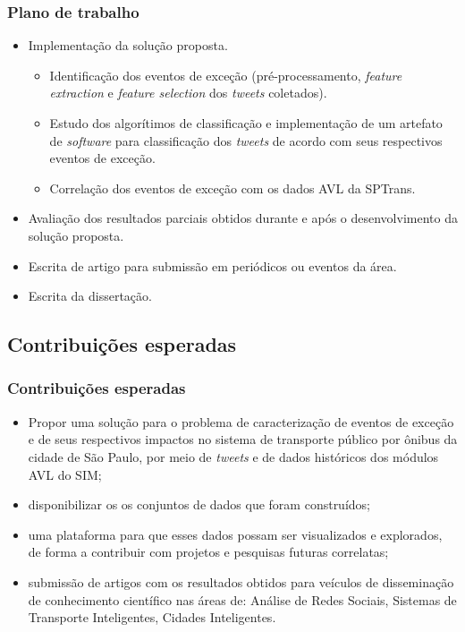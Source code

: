 \documentclass{beamer}
\begin{document}
\begin{frame}
\frametitle{Plano de trabalho}
\begin{itemize}
\item Implementação da solução proposta.
\begin{itemize}
\item Identificação dos eventos de exceção (pré-processamento, \textit{feature extraction} e \textit{feature selection} dos \textit{tweets} coletados).
\item Estudo dos algorítimos de classificação e implementação de um artefato de \textit{software} para classificação dos \textit{tweets} de acordo com seus respectivos eventos de exceção.
\item Correlação dos eventos de exceção com os dados AVL da SPTrans.
\end{itemize}
\item Avaliação dos resultados parciais obtidos durante e após o desenvolvimento da solução proposta.
\item Escrita de artigo para submissão em periódicos ou eventos da área.
\item Escrita da dissertação.
\end{itemize}
\end{frame}
\subsection{Contribuições esperadas}
\begin{frame}
\frametitle{Contribuições esperadas}
\begin{itemize}
\item Propor uma solução para o problema de caracterização de eventos de exceção e de seus respectivos impactos no sistema de transporte público por ônibus da cidade de São Paulo, por meio de \textit{tweets} e de dados históricos dos módulos AVL do SIM;
\item disponibilizar os os conjuntos de dados que foram construídos;
\item uma plataforma para que esses dados possam ser visualizados e explorados, de forma a contribuir com projetos e pesquisas futuras correlatas;
\item submissão de artigos com os resultados obtidos para veículos de disseminação de conhecimento científico nas áreas de: Análise de Redes Sociais, Sistemas de Transporte Inteligentes, Cidades Inteligentes.
\end{itemize}
\end{frame}
\end{document}
